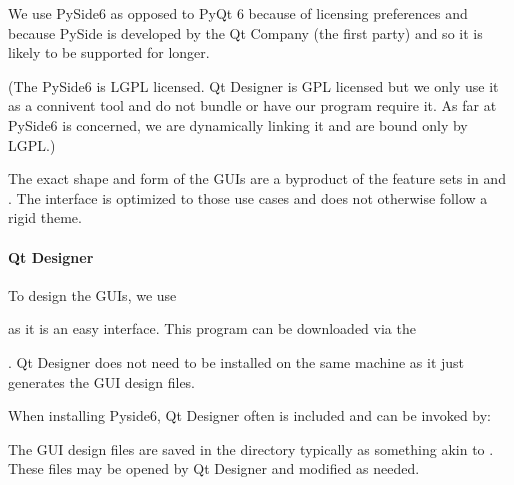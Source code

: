 \documentclass[letterpaper,11pt,english]{sphinxmanual}
\begin{document}
\sphinxAtStartPar
We use PySide6 as opposed to PyQt 6 because of licensing preferences and
because PySide is developed by the Qt Company (the first party) and so it is
likely to be supported for longer.

\sphinxAtStartPar
(The PySide6 is LGPL licensed. Qt Designer is GPL licensed but we only use it
as a connivent tool and do not bundle or have our program require it. As far
at PySide6 is concerned, we are dynamically linking it and are bound only by
LGPL.)

\sphinxAtStartPar
The exact shape and form of the GUIs are a byproduct of the feature sets in
{\hyperref[\detokenize{user/manual_mode:user-manual-mode}]{}} and {\hyperref[\detokenize{user/automatic_mode:user-automatic-mode}]{}}. The interface is
optimized to those use cases and does not otherwise follow a rigid theme.


\paragraph{Qt Designer}
\label{\detokenize{technical/architecture/graphical_user_interface:qt-designer}}
\sphinxAtStartPar
To design the GUIs, we use
%
\begin{footnote}[42]\sphinxAtStartFootnote
{}
%
\end{footnote} as it is an
easy interface. This program can be downloaded via the
%
\begin{footnote}[43]\sphinxAtStartFootnote
{}
%
\end{footnote}.
Qt Designer does not need to be installed on the same machine as it just
generates the GUI design files.

\sphinxAtStartPar
When installing Pyside6, Qt Designer often is included and can be invoked by:

\begin{sphinxVerbatim}[commandchars=\\\{\}]
\end{sphinxVerbatim}

\sphinxAtStartPar
The GUI design files are saved in the 
directory typically as something akin to . These files may be
opened by Qt Designer and modified as needed.
\end{document}
